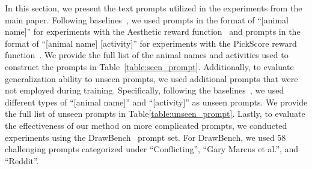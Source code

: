 In this section, we present the text prompts utilized in the experiments from the main paper. Following baselines~\cite{ddpo, alignprop}, we used prompts in the format of “[animal name]” for experiments with the Aesthetic reward function~\cite{aesthetic} and prompts in the format of “[animal name] [activity]” for experiments with the PickScore reward function~\cite{pickscore}.
We provide the full list of the animal names and activities used to construct the prompts in Table~\ref{table:seen_prompt}.
Additionally, to evaluate generalization ability to unseen prompts, we used additional prompts that were not employed during training. 
Specifically, following the baselines~\cite{ddpo,alignprop}, we used different types of “[animal name]” and “[activity]” as unseen prompts.
We provide the full list of unseen prompts in Table\ref{table:unseen_prompt}.
Lastly, to evaluate the effectiveness of our method on more complicated prompts, we conducted experiments using the DrawBench~\cite{imagen} prompt set. 
For DrawBench, we used 58 challenging prompts categorized under “Conflicting”, “Gary Marcus et al.”, and “Reddit”.
